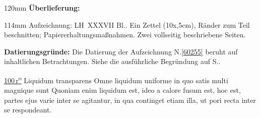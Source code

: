 %
\frenchspacing%
\begin{ledgroupsized}[r]{120mm}%
\footnotesize%
\pstart%
\noindent\textbf{Überlieferung:}%
\pend%
\end{ledgroupsized}%
\begin{ledgroupsized}[r]{114mm}%
\footnotesize%
\pstart%
\parindent -6mm%
%
Aufzeichnung:
LH~XXXVII Bl.. 
Ein Zettel (10\:x,5\;cm),
Ränder zum Teil beschnitten;
Papiererhaltungsmaßnahmen.
Zwei vollseitig beschriebene Seiten.
\pend%
\end{ledgroupsized}%
\vspace{5mm}%
\begin{ledgroup}%
\footnotesize%
\pstart%
\noindent%
\textbf{Datierungsgründe:}
Die Datierung der Aufzeichnung N.\;\ref{60255} beruht auf %
inhaltlichen Betrachtungen.
Siehe die ausführliche Begründung auf S.\;\pageref{60255_dat}.%
\pend%
\end{ledgroup}%
%
\frenchspacing%
\vspace{8mm}%
\normalsize%
\pstart%
\noindent%
\lbrack%
\href{\Scan{LH_37_04_100r}}%
{100\,r\textsuperscript{o}}%
\rbrack%
\hfill%
Liquidum transparens%
\hfill%
%
\pend%
\vspace*{0.5em}%
\pstart%
\noindent%
Omne liquidum uniforme%
in quo satis multi magnique sunt%
Quo\-ni\-am enim liquidum est,
ideo a calore fusum est,%
%
hoc est,
partes ejus varie inter se agitantur,%
in qua
continget etiam illa,
ut pori recta inter se respondeant.%
%

